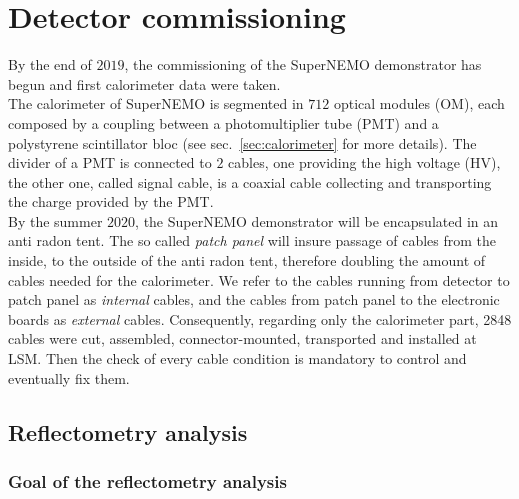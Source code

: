 \chapter{Detector commissioning}
\label{sec:commissioning}

By the end of $2019$, the commissioning of the SuperNEMO demonstrator has begun and first calorimeter data were taken.\\
The calorimeter of SuperNEMO is segmented in $712$ optical modules (OM), each composed by a coupling between a photomultiplier tube (PMT) and a polystyrene scintillator bloc (see sec.~\ref{sec:calorimeter} for more details).
The divider of a PMT is connected to $2$ cables, one providing the high voltage (HV), the other one, called signal cable, is a coaxial cable collecting and transporting the charge provided by the PMT.\\
By the summer $2020$, the SuperNEMO demonstrator will be encapsulated in an anti radon tent.
The so called \emph{patch panel} will insure passage of cables from the inside, to the outside of the anti radon tent, therefore doubling the amount of cables needed for the calorimeter.
We refer to the cables running from detector to patch panel as \emph{internal} cables, and the cables from patch panel to the electronic boards as \emph{external} cables.
Consequently, regarding only the calorimeter part, 2848 cables were cut, assembled, connector-mounted, transported and installed at LSM.
Then the check of every cable condition is mandatory to control and eventually fix them.

\section{Reflectometry analysis}
\label{sec:reflecto}

\subsection{Goal of the reflectometry analysis}

